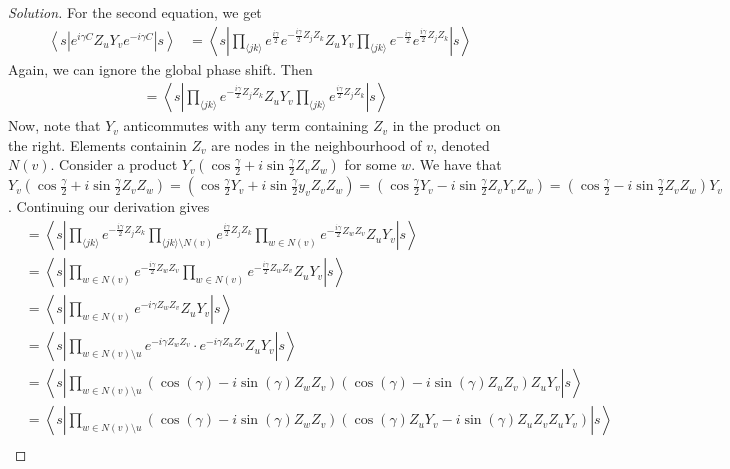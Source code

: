 \documentclass[11pt]{article}
\newenvironment{question}[2][Question]{\begin{trivlist}
\item[\hskip \labelsep {\bfseries #1}\hskip \labelsep {\bfseries #2.}]}{\end{trivlist}}
\newenvironment{solution}{\begin{proof}[Solution]}{\end{proof}}
\newcommand{\lr}[3]{\!\left#1 #3 \right#2}
\begin{document}
\begin{question}{2}
\begin{enumerate}[(a)]
\begin{solution}
                For the second equation, we get 
                \begin{align*}
                    \left\langle s\left|e^{i \gamma C} Z_u Y_v e^{-i \gamma C}\right| s\right\rangle &= \left\langle s\left|\prod_{\langle jk\rangle} e^{\frac{i\gamma}{2}}e^{-\frac{i\gamma}{2}Z_jZ_k }Z_uY_v \prod_{\langle jk\rangle} e^{-\frac{i\gamma}{2}}e^{\frac{i\gamma}{2}Z_jZ_k }\right|s\right\rangle 
                \end{align*}
                Again, we can ignore the global phase shift. Then
                \begin{align*}
                    &= \left\langle s\left|\prod_{\langle jk\rangle} e^{-\frac{i\gamma}{2}Z_jZ_k }Z_uY_v \prod_{\langle jk\rangle} e^{\frac{i\gamma}{2}Z_jZ_k }\right|s\right\rangle 
                \end{align*}
                Now, note that $Y_v$ anticommutes with any term containing $Z_v$ in the product on the right. Elements containin $Z_v$ are nodes in the neighbourhood of $v$, denoted $N(v)$. Consider a product $Y_v(\cos\frac{\gamma}{2}+i\sin\frac{\gamma}{2}Z_vZ_w)$ for some $w$. We have that $Y_v(\cos\frac{\gamma}{2}+i\sin\frac{\gamma}{2}Z_vZ_w)=(\cos\frac{\gamma}{2}Y_v+i\sin\frac{\gamma}{2}y_vZ_vZ_w)=(\cos\frac{\gamma}{2}Y_v-i\sin\frac{\gamma}{2}Z_vY_vZ_w)=(\cos\frac{\gamma}{2}-i\sin\frac{\gamma}{2}Z_vZ_w)Y_v$. Continuing our derivation gives
                \begin{align*}
                    &= \lr\langle\rangle{s\lr||{\prod_{\langle jk\rangle}e^{-\frac{i\gamma}{2}Z_jZ_k}\prod_{\langle jk\rangle \setminus N(v)}e^{\frac{i\gamma}{2}Z_jZ_k}\prod_{w\in N(v)}e^{-\frac{i\gamma}{2}Z_wZ_v}Z_uY_v}s} \\
                    &= \lr\langle\rangle{s\lr||{\prod_{w\in N(v)}e^{-\frac{i\gamma}{2}Z_wZ_v}\prod_{w\in N(v)}e^{-\frac{i\gamma}{2}Z_wZ_v}Z_uY_v}s} \\
                    &= \lr\langle\rangle{s\lr||{\prod_{w\in N(v)}e^{-i\gamma Z_wZ_v}{Z_uY_v}}s} \\
                    &= \lr\langle\rangle{s\lr||{\prod_{w\in N(v)\setminus u}e^{-i\gamma Z_wZ_v}\cdot e^{-i\gamma Z_uZ_v}{Z_uY_v}}s} \\
                    &= \lr\langle\rangle{s\lr||{\prod_{w\in N(v)\setminus u}\lr(){\cos\lr(){\gamma}-i\sin\lr(){\gamma}Z_wZ_v}\lr(){\cos(\gamma)-i\sin(\gamma)Z_uZ_v}Z_uY_v}s} \\
                    &= \lr\langle\rangle{s\lr||{\prod_{w\in N(v)\setminus u}\lr(){\cos\lr(){\gamma}-i\sin\lr(){\gamma}Z_wZ_v}\lr(){\cos(\gamma)Z_uY_v-i\sin(\gamma)Z_uZ_vZ_uY_v}}s} \\

\end{align*}
\end{solution}
\end{enumerate}
\end{question}
\end{document}
